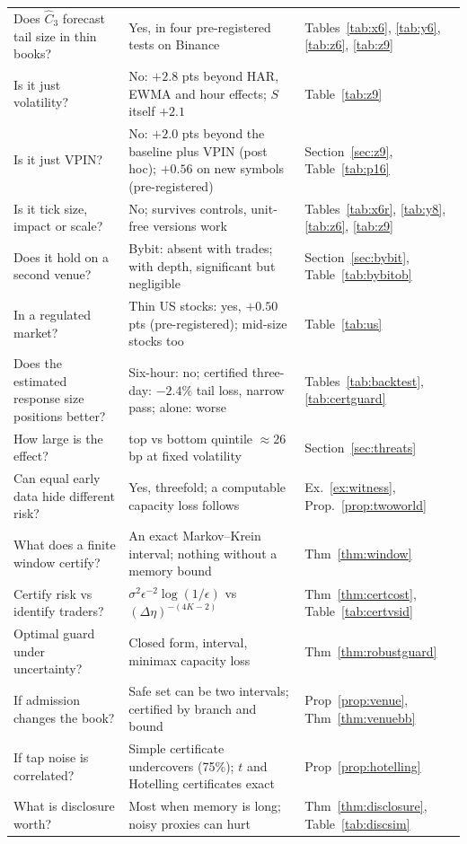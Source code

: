 \documentclass[12pt]{article}
\theoremstyle{definition}
\theoremstyle{remark}
\begin{document}
{\begin{longtable}{p{}p{}p{}}
Does $\hat C_3$ forecast tail size in thin books? & Yes, in four pre-registered tests on Binance & Tables~\ref{tab:x6}, \ref{tab:y6}, \ref{tab:z6}, \ref{tab:z9}\\
Is it just volatility? & No: $+2.8$ pts beyond HAR, EWMA and hour effects; $S$ itself $+2.1$ & Table~\ref{tab:z9}\\
Is it just VPIN? & No: $+2.0$ pts beyond the baseline plus VPIN (post hoc); $+0.56$ on new symbols (pre-registered) & Section~\ref{sec:z9}, Table~\ref{tab:p16}\\
Is it tick size, impact or scale? & No; survives controls, unit-free versions work & Tables~\ref{tab:x6r}, \ref{tab:y8}, \ref{tab:z6}, \ref{tab:z9}\\
Does it hold on a second venue? & Bybit: absent with trades; with depth, significant but negligible & Section~\ref{sec:bybit}, Table~\ref{tab:bybitob}\\
In a regulated market? & Thin US stocks: yes, $+0.50$ pts (pre-registered); mid-size stocks too & Table~\ref{tab:us}\\
Does the estimated response size positions better? & Six-hour: no; certified three-day: $-2.4\%$ tail loss, narrow pass; alone: worse & Tables~\ref{tab:backtest}, \ref{tab:certguard}\\
How large is the effect? & top vs bottom quintile $\approx26$ bp at fixed volatility & Section~\ref{sec:threats}\\
Can equal early data hide different risk? & Yes, threefold; a computable capacity loss follows & Ex.~\ref{ex:witness}, Prop.~\ref{prop:twoworld}\\
What does a finite window certify? & An exact Markov--Krein interval; nothing without a memory bound & Thm~\ref{thm:window}\\
Certify risk vs identify traders? & $\sigma^2\epsilon^{-2}\log(1/\epsilon)$ vs $(\Delta\eta)^{-(4K-2)}$ & Thm~\ref{thm:certcost}, Table~\ref{tab:certvsid}\\
Optimal guard under uncertainty? & Closed form, interval, minimax capacity loss & Thm~\ref{thm:robustguard}\\
If admission changes the book? & Safe set can be two intervals; certified by branch and bound & Prop~\ref{prop:venue}, Thm~\ref{thm:venuebb}\\
If tap noise is correlated? & Simple certificate undercovers (75\%); $t$ and Hotelling certificates exact & Prop~\ref{prop:hotelling}\\
What is disclosure worth? & Most when memory is long; noisy proxies can hurt & Thm~\ref{thm:disclosure}, Table~\ref{tab:discsim}\\

\end{longtable}}
\end{document}
